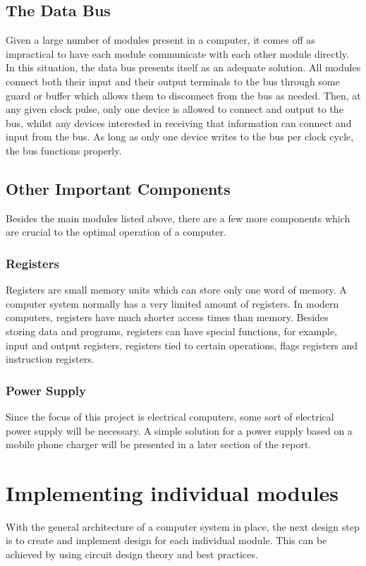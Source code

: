 \subsection{The Data Bus}
Given a large number of modules present in a computer, it comes off as impractical to have each module communicate with each other module directly. In this situation, the data bus presents itself as an adequate solution. All modules connect both their input and their output terminals to the bus through some guard or buffer which allows them to disconnect from the bus as needed. Then, at any given clock pulse, only one device is allowed to connect and output to the bus, whilst any devices interested in receiving that information can connect and input from the bus. As long as only one device writes to the bus per clock cycle, the bus functions properly.

\subsection{Other Important Components}
Besides the main modules listed above, there are a few more components which are crucial to the optimal operation of a computer.

\subsubsection{Registers}
Registers are small memory units which can store only one word of memory. A computer system normally has a very limited amount of registers. In modern computers, registers have much shorter access times than memory. Besides storing data and programs, registers can have special functions, for example, input and output registers, registers tied to certain operations, flags registers and instruction registers.

\subsubsection{Power Supply}
Since the focus of this project is electrical computers, some sort of electrical power supply will be necessary. A simple solution for a power supply based on a mobile phone charger will be presented in a later section of the report.

\section{Implementing individual modules}
With the general architecture of a computer system in place, the next design step is to create and implement design for each individual module. This can be achieved by using circuit design theory and best practices.

